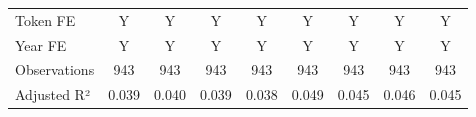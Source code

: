 {\begin{tabular}{l*{8}{c}}
\midrule
Token FE            &           Y         &           Y         &           Y         &           Y         &           Y         &           Y         &           Y         &           Y         \\
Year FE             &           Y         &           Y         &           Y         &           Y         &           Y         &           Y         &           Y         &           Y         \\
Observations        &         943         &         943         &         943         &         943         &         943         &         943         &         943         &         943         \\
Adjusted R²         &       0.039         &       0.040         &       0.039         &       0.038         &       0.049         &       0.045         &       0.046         &       0.045         \\
\bottomrule
\end{tabular}
}

